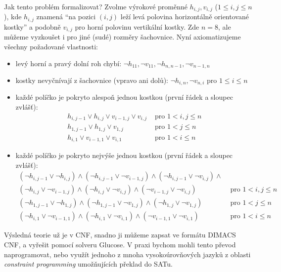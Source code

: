 Jak tento problém formalizovat? Zvolme výrokové proměnné $h_{i,j},v_{i,j}$ ($1\leq i,j\leq n$), kde $h_{i,j}$ znamená ``na pozici $(i,j)$ leží levá polovina horizontálně orientované kostky'' a podobně $v_{i,j}$ pro horní polovinu vertikální kostky. Zde $n=8$, ale můžeme vyzkoušet i pro jiné (sudé) rozměry šachovnice. Nyní axiomatizujeme všechny požadované vlastnosti:
\begin{itemize}
    \item levý horní a pravý dolní roh chybí: $\neg h_{11},\neg v_{11},\neg h_{n,n-1},\neg v_{n-1,n}$
    \item kostky nevyčnívají z šachovnice (vpravo ani dolů): $\neg h_{i,n},\neg v_{n,i}$ pro  $1\leq i\leq n$
    \item každé políčko je pokryto alespoň jednou kostkou (první řádek a sloupec zvlášť):
    \begin{align*}
        h_{i,j-1}\lor h_{i,j}\lor v_{i-1,j}\lor v_{i,j}&\text{ pro }1<i,j\leq n\\
        h_{1,j-1}\lor h_{1,j}\lor v_{1,j}&\text{ pro }1<j\leq n\\
        h_{i,1}\lor v_{i-1,1}\lor v_{i,1}&\text{ pro }1<i\leq n
    \end{align*}
    \item každé políčko je pokryto nejvýše jednou kostkou (první řádek a sloupec zvlášť):
    \begin{align*}
        (\neg h_{i,j-1}\lor\neg h_{i,j})\land
        (\neg h_{i,j-1}\lor\neg v_{i-1,j})\land        
        (\neg h_{i,j-1}\lor\neg v_{i,j})\land&\\
        (\neg h_{i,j}\lor\neg v_{i-1,j})\land
        (\neg h_{i,j}\lor\neg v_{i,j})\land
        (\neg v_{i-1,j}\lor\neg v_{i,j})
        &\text{ pro }1<i,j\leq n\\
        (\neg h_{1,j-1}\lor \neg h_{1,j})\land(\neg h_{1,j-1}\lor \neg v_{1,j})\land(\neg h_{1,j}\lor \neg v_{1,j})&\text{ pro }1<j\leq n\\
        (\neg h_{i,1}\lor \neg v_{i-1,1})\land(\neg h_{i,1}\lor\neg v_{i,1})\land (\neg v_{i-1,1}\lor\neg v_{i,1})&\text{ pro }1<i\leq n
    \end{align*}    




\end{itemize}

Výsledná teorie už je v CNF, snadno ji můžeme zapsat ve formátu DIMACS CNF, a vyřešit pomocí solveru Glucose. V praxi bychom mohli tento převod naprogramovat, nebo využít jednoho z mnoha vysokoúrovňových jazyků z oblasti \emph{constraint programming} umožňujících překlad do SATu.

